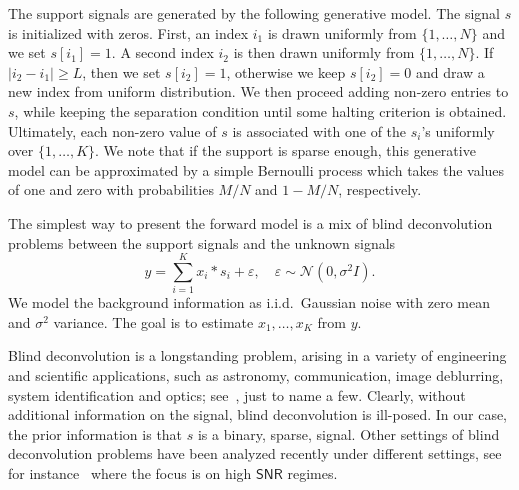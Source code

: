 \documentclass[english]{article}
\numberwithin{equation}{section}
\theoremstyle{plain}
\theoremstyle{definition}
\theoremstyle{remark}
\theoremstyle{plain}
\theoremstyle{remark}
\theoremstyle{plain}
\theoremstyle{plain}
\newcommand{\SNR}{{\textsf{SNR}}}
\begin{document}
The support signals are generated by the following generative model. The signal $s$ is initialized with zeros.
First, an index $i_1$ is drawn uniformly from $\{1,\ldots,N\}$ and we set $s[i_1]=1$. A second index $i_2$ is then drawn uniformly from $\{1,\ldots,N\}$. If $\vert i_2-i_1\vert \geq L$,
then we set $s[i_2]=1$, otherwise we keep $s[i_2]=0$ and draw a new index  from uniform distribution. We then proceed adding  non-zero entries to $s$,  while keeping the separation condition until some halting criterion is obtained. Ultimately, each  non-zero value of $s$ is associated with one of the $s_i$'s uniformly over  $\{1,\ldots,K\}$. We note that if the support is sparse enough, this generative model can be approximated by a simple Bernoulli process which takes the values of one and zero with probabilities  $M/N$ and $1-M/N$, respectively.

The simplest way to present the forward model is a mix of blind deconvolution problems between the support signals and the unknown signals
\begin{equation}
y = \sum_{i=1}^K x_i\ast s_i + \varepsilon,\quad \varepsilon\sim\mathcal{N}(0,\sigma^2 I).
\end{equation}
We model the background information as i.i.d.\ Gaussian noise with zero mean and $\sigma^2$ variance. 
The goal is to estimate $x_1,\ldots,x_K$ from $y$.

Blind deconvolution is a longstanding problem, arising in a variety of engineering and scientific applications, such as astronomy, communication, image deblurring, system identification and optics; see~\cite{jefferies1993restoration,shalvi1990new,ayers1988iterative,abed1997blind}, just to name a few. Clearly, without additional information on the signal, blind deconvolution is ill-posed. In our case, the prior information is that $s$ is a binary, sparse, signal. 
Other settings of blind deconvolution problems have been analyzed recently under different settings, see for instance~\cite{ahmed2014blind,li2016identifiability,li2016rapid,ling2015self,ling2017blind,chi2016guaranteed}
where the focus is on high $\SNR$ regimes.
\end{document}
